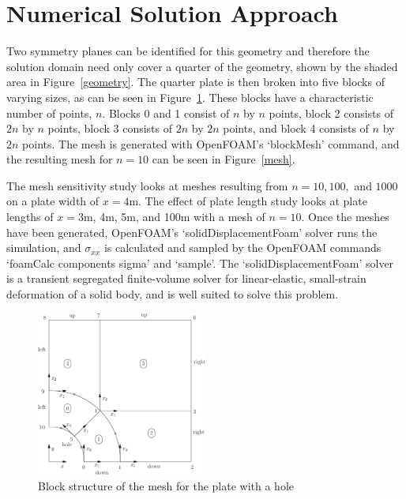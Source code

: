 \documentclass[twocolumn,10pt]{asme2ej}
\begin{document}
\section{Numerical Solution Approach}
 Two symmetry planes can be identified for this geometry and therefore the solution domain need only cover a quarter of the geometry, shown by the shaded area in Figure~\ref{geometry}. The quarter plate is then broken into five blocks of varying sizes, as can be seen in Figure~\ref{blocks}. These blocks have a characteristic number of points, $n$. Blocks 0 and 1 consist of $n$ by $n$ points, block 2 consists of $2n$ by $n$ points, block 3 consists of $2n$ by $2n$ points, and block 4 consists of $n$ by $2n$ points. The mesh is generated with OpenFOAM's `blockMesh' command, and the resulting mesh for $n = 10$ can be seen in Figure~\ref{mesh}.

 The mesh sensitivity study looks at meshes resulting from $n = 10, 100, $ and $1000$ on a plate width of $x = 4$m. The effect of plate length study looks at plate lengths of $x = 3$m, 4m, 5m, and 100m with a mesh of $n = 10$. Once the meshes have been generated, OpenFOAM's `solidDisplacementFoam' solver runs the simulation, and $\sigma_{xx}$ is calculated and sampled by the OpenFOAM commands `foamCalc components sigma' and `sample'. The `solidDisplacementFoam' solver is a transient segregated finite-volume solver for linear-elastic, small-strain deformation of a solid body, and is well suited to solve this problem.

\begin{figure}[tb]
\begin{center}
\includegraphics[width=0.5\textwidth]{figure/user149x.png}
\caption{Block structure of the mesh for the plate with a hole}
\label{blocks}
\end{center}
\end{figure}
\end{document}

